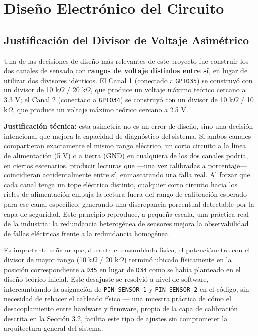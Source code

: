 \documentclass[12pt, letterpaper]{article}
\begin{document}
	\section{Diseño Electrónico del Circuito}
	
	\subsection{Justificación del Divisor de Voltaje Asimétrico}
	Una de las decisiones de diseño más relevantes de este proyecto fue construir los dos canales de sensado con \textbf{rangos de voltaje distintos entre sí}, en lugar de utilizar dos divisores idénticos. El Canal 1 (conectado a \texttt{GPIO35}) se construyó con un divisor de 10 k$\Omega$ / 20 k$\Omega$, que produce un voltaje máximo teórico cercano a 3.3 V; el Canal 2 (conectado a \texttt{GPIO34}) se construyó con un divisor de 10 k$\Omega$ / 10 k$\Omega$, que produce un voltaje máximo teórico cercano a 2.5 V.
	
	\textbf{Justificación técnica:} esta asimetría no es un error de diseño, sino una decisión intencional que mejora la capacidad de diagnóstico del sistema. Si ambos canales compartieran exactamente el mismo rango eléctrico, un corto circuito a la línea de alimentación (5 V) o a tierra (GND) en cualquiera de los dos canales podría, en ciertos escenarios, producir lecturas que —una vez calibradas a porcentaje— coincidieran accidentalmente entre sí, enmascarando una falla real. Al forzar que cada canal tenga un tope eléctrico distinto, cualquier corto circuito hacia los rieles de alimentación empuja la lectura fuera del rango de calibración esperado para ese canal específico, generando una discrepancia porcentual detectable por la capa de seguridad. Este principio reproduce, a pequeña escala, una práctica real de la industria: la redundancia heterogénea de sensores mejora la observabilidad de fallas eléctricas frente a la redundancia homogénea.
	
	Es importante señalar que, durante el ensamblado físico, el potenciómetro con el divisor de mayor rango (10 k$\Omega$ / 20 k$\Omega$) terminó ubicado físicamente en la posición correspondiente a \texttt{D35} en lugar de \texttt{D34} como se había planteado en el diseño teórico inicial. Este desajuste se resolvió a nivel de software, intercambiando la asignación de \texttt{PIN\_SENSOR\_1} y \texttt{PIN\_SENSOR\_2} en el código, sin necesidad de rehacer el cableado físico — una muestra práctica de cómo el desacoplamiento entre hardware y firmware, propio de la capa de calibración descrita en la Sección 3.2, facilita este tipo de ajustes sin comprometer la arquitectura general del sistema.
	
\end{document}
